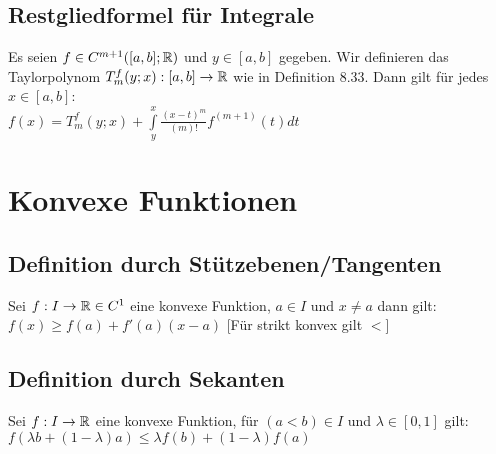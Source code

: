 \documentclass[german]{latex4ei/latex4ei_sheet}
\begin{document}


\begin{sectionbox}
	\subsection{Restgliedformel für Integrale}
	Es seien $f \in C^{m+1}([a,b];\operatorname{\mathbb R})$ und $y \in [a,b]$ gegeben. Wir definieren das Taylorpolynom $T_m^f (y; x) : [a, b] \rightarrow \operatorname{\mathbb R}$ wie in Definition 8.33. Dann gilt für jedes $x \in [a, b]$:\\
	$f(x)=T_m^f(y;x)+ \int \limits_{y}^x \frac{(x-t)^m}{(m)!}f^{(m+1)}(t)dt$
	

\end{sectionbox}





\section{Konvexe Funktionen}

\begin{sectionbox}
	\subsection{Definition durch Stützebenen/Tangenten}
	Sei $f:I \rightarrow \operatorname{\mathbb R} \in C^1$ eine konvexe Funktion, $a \in I$ und $x \neq a$ dann gilt:\\
	$f(x) \ge f(a)+f'(a)(x-a)$	[Für strikt konvex gilt $<$]
	\end{sectionbox}


			




\begin{sectionbox}
	\subsection{Definition durch Sekanten}
	Sei $f:I \rightarrow \operatorname{\mathbb R}$ eine konvexe Funktion, für $(a<b) \in I$ und $\lambda \in [0,1] $ gilt:\\
	$f(\lambda b+ (1-\lambda)a) \le \lambda f(b)+ (1-\lambda)f(a) $

\end{sectionbox}
\end{document}
